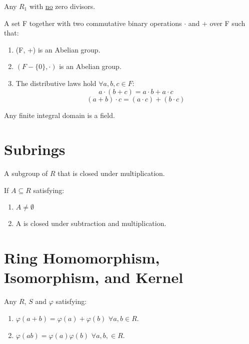 \begin{defn}
	Any ${R}_{1}$ with \underline{no} zero divisors.
\end{defn}
\begin{defn}[Field]
	A set F together with two commutative binary operations $\cdot$ and + over F such that:
	\begin{enumerate}
		\item (F, +) is an Abelian group.
		\item $(F - \{ 0 \}, \cdot)$ is an Abelian group.
		\item The distributive laws hold $\forall a, b, c \in F$:
		\[a \cdot (b + c) = a \cdot b + a \cdot c\]
		\[(a + b) \cdot c = (a \cdot c) + (b \cdot c)\]
	\end{enumerate}
\end{defn}
\begin{prop}
	Any finite integral domain is a field.
\end{prop}
\section{Subrings}
\begin{defn}
	A subgroup of $R$ that is closed under multiplication.
\end{defn}
\begin{defn}
	If $A \subseteq R$ satisfying:
	\begin{enumerate}
		\item $ A \not = \emptyset$
		\item A is closed under subtraction and multiplication.
	\end{enumerate} 
\end{defn}

\section{Ring Homomorphism, Isomorphism, and Kernel}
\begin{defn}
	Any $R$, $S$ and $\varphi$ satisfying:
	\begin{enumerate}
		\item $\varphi(a + b) = \varphi(a)+\varphi(b)$ $\forall a,b \in R$.
		\item $\varphi(ab) = \varphi(a)\varphi(b)$ $\forall a,b, \in R$.
	\end{enumerate}
\end{defn}

